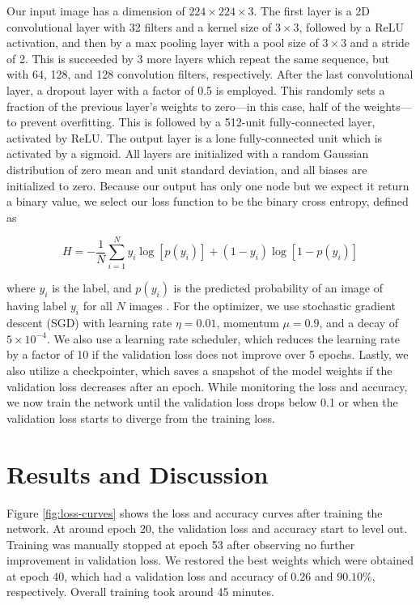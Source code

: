 \documentclass[12pt,a4paper]{article}
\begin{document}
Our input image has a dimension of $224 \times 224 \times 3$. The first layer is a 2D convolutional layer with 32 filters and a kernel size of $3 \times 3$, followed by a ReLU activation, and then by a max pooling layer with a pool size of $3 \times 3$ and a stride of 2. This is succeeded by 3 more layers which repeat the same sequence, but with 64, 128, and 128 convolution filters, respectively. After the last convolutional layer, a dropout layer with a factor of 0.5 is employed. This randomly sets a fraction of the previous layer's weights to zero---in this case, half of the weights---to prevent overfitting. This is followed by a 512-unit fully-connected layer, activated by ReLU. The output layer is a lone fully-connected unit which is activated by a sigmoid. All layers are initialized with a random Gaussian distribution of zero mean and unit standard deviation, and all biases are initialized to zero. Because our output has only one node but we expect it return a binary value, we select our loss function to be the binary cross entropy, defined as

\begin{equation}\label{eq:loss}
	H = -\frac{1}{N} \sum_{i=1}^N y_i \log[p(y_i)] + (1 - y_i) \log[1 - p(y_i)]
\end{equation}

\noindent where $y_i$ is the label, and $p(y_i)$ is the predicted probability of an image of having label $y_i$ for all $N$ images \cite{godoy}. For the optimizer, we use stochastic gradient descent (SGD) with learning rate $\eta = 0.01$, momentum $\mu = 0.9$, and a decay of $5 \times 10^{-4}$. We also use a learning rate scheduler, which reduces the learning rate by a factor of 10 if the validation loss does not improve over 5 epochs. Lastly, we also utilize a checkpointer, which saves a snapshot of the model weights if the validation loss decreases after an epoch. While monitoring the loss and accuracy, we now train the network until the validation loss drops below 0.1 or when the validation loss starts to diverge from the training loss.

\section{Results and Discussion}
Figure \ref{fig:loss-curves} shows the loss and accuracy curves after training the network. At around epoch 20, the validation loss and accuracy start to level out. Training was manually stopped at epoch 53 after observing no further improvement in validation loss. We restored the best weights which were obtained at epoch 40, which had a validation loss and accuracy of $0.26$ and $90.10\%$, respectively. Overall training took around 45 minutes.
\end{document}
